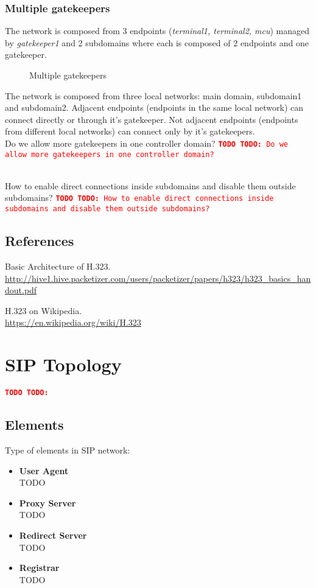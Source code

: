 \documentclass[a4paper]{report}
\newcommand{\TODO}[1]{%
\def\empty{}%
\def\prvniparametr{#1}%
\ifx\prvniparametr\empty%
\begingroup\tt\textcolor{red}{\noindent\textbf{TODO}}\endgroup
\else%
\begingroup\tt\textcolor{red}{\noindent\textbf{TODO:}\ #1}\endgroup
\fi%
}
\newcommand{\graph}[4]{
\begin{figure}[h!]
\centering\scalebox{\ifx&#4& 0.7 \else #4 \fi}{}
\label{#1}
\caption{#3}
\end{figure}
}
\begin{document}
\subsubsection{Multiple gatekeepers}

The network is composed from 3 endpoints (\emph{terminal1, terminal2, mcu}) managed by \emph{gatekeeper1} and 2 subdomains where each is composed of 2 endpoints and one gatekeeper. 
\graph{graph:h323:gatekeeperMultiple}{graph/h323_gatekeeper_multiple.tex}{Multiple gatekeepers}{0.6}
The network is composed from three local networks: main domain, subdomain1 and subdomain2. Adjacent endpoints (endpoints in the same local network) can connect directly or through it's gatekeeper. Not adjacent endpoints (endpoints from different local networks) can connect only by it's gatekeepers.
\\ \TODO{Do we allow more gatekeepers in one controller domain?}
\\ \TODO{How to enable direct connections inside subdomains and disable them outside subdomains?}

\subsection{References}

\renewcommand{\bibsection}{}
\begin{thebibliography}{1}

Basic Architecture of H.323.
\\ \url{http://hive1.hive.packetizer.com/users/packetizer/papers/h323/h323_basics_handout.pdf}

H.323 on Wikipedia.
\\ \url{https://en.wikipedia.org/wiki/H.323}

\end{thebibliography}


\section{SIP Topology}

\TODO{}

\subsection{Elements}

Type of elements in SIP network:

\begin{itemize}
\item \textbf{User Agent} \\
TODO
\item \textbf{Proxy Server} \\
TODO
\item \textbf{Redirect Server} \\
TODO
\item \textbf{Registrar} \\
TODO
\end{itemize}
\end{document}
